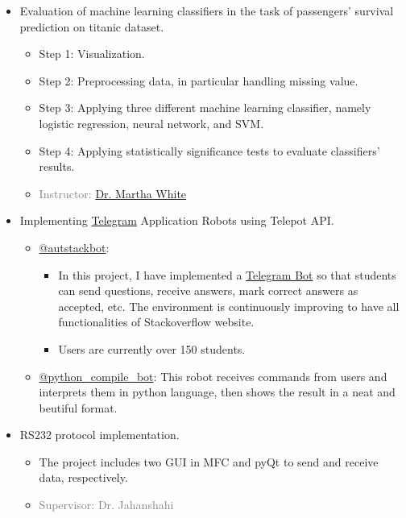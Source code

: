\begin{itemize}
		\item Evaluation of machine learning classifiers in the task of passengers' survival prediction on titanic dataset.
		\begin{itemize}
			\item Step 1: Visualization.
			\item Step 2: Preprocessing data, in particular handling missing value.
			\item Step 3: Applying three different machine learning classifier, namely logistic regression, neural network, and SVM.
			\item Step 4: Applying statistically significance tests to evaluate classifiers' results.
			\item \textcolor{gray}{Instructor: \href{http://webdocs.cs.ualberta.ca/~whitem/}{Dr. Martha White}}
		\end{itemize}
		\item Implementing \href{https://telegram.org/}{Telegram} Application Robots using Telepot API.
		\begin{itemize}
			\item \href{https://telegram.me/autstackbot}{@autstackbot}:
			\begin{itemize}
				\item In this project, I have implemented a \href{https://telegram.org/blog/bot-revolution}{Telegram Bot} so that students can send questions, receive answers, mark correct answers as accepted, etc. The environment is continuously improving to have all functionalities of Stackoverflow website.
				\item Users are currently over 150 students.
			\end{itemize}
			\item \href{https://telegram.me/python_compile_bot}{@python\_compile\_bot}: This robot receives commands from users and interprets them in python language, then shows the result in a neat and beutiful format.
		\end{itemize}
		
		\item RS232 protocol implementation.
		\begin{itemize}
			\item The project includes two GUI in MFC and pyQt to send and receive data, respectively. 
			\item \textcolor{gray}{Supervisor: Dr. Jahanshahi}
		\end{itemize}
	\end{itemize}


